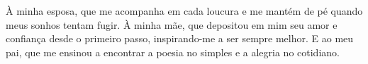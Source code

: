 
À minha esposa, que me acompanha em cada loucura e me mantém de pé quando meus sonhos tentam fugir.
À minha mãe, que depositou em mim seu amor e confiança desde o primeiro passo, inspirando-me a ser sempre melhor.
E ao meu pai, que me ensinou a encontrar a poesia no simples e a alegria no cotidiano.